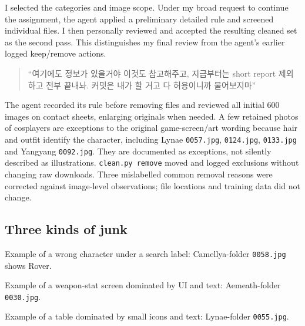 \documentclass[11pt]{article}
\begin{document}
I selected the categories and image scope. Under my broad request to continue the assignment, the agent applied a preliminary detailed rule and screened individual files. I then personally reviewed and accepted the resulting cleaned set as the second pass. This distinguishes my final review from the agent's earlier logged keep/remove actions.
\begin{quote}
``여기에도 정보가 있을거야 이것도 참고해주고, 지금부터는 short report 제외하고 전부 끝내놔. 커밋은 내가 할 거고 다 허용이니까 물어보지마''
\end{quote}
The agent recorded its rule before removing files and reviewed all initial 600 images on contact sheets, enlarging originals when needed. A few retained photos of cosplayers are exceptions to the original game-screen/art wording because hair and outfit identify the character, including Lynae \texttt{0057.jpg}, \texttt{0124.jpg}, \texttt{0133.jpg} and Yangyang \texttt{0092.jpg}. They are documented as exceptions, not silently described as illustrations. \texttt{clean.py remove} moved and logged exclusions without changing raw downloads. Three mislabelled common removal reasons were corrected against image-level observations; file locations and training data did not change.

\subsection*{Three kinds of junk}
\par\noindent\begin{minipage}{\linewidth}
Example of a wrong character under a search label: Camellya-folder \texttt{0058.jpg} shows Rover.
\begin{center}\par\noindent {}\par\end{center}
\end{minipage}\par\medskip
\par\noindent\begin{minipage}{\linewidth}
Example of a weapon-stat screen dominated by UI and text: Aemeath-folder \texttt{0030.jpg}.
\begin{center}\par\noindent {}\par\end{center}
\end{minipage}\par\medskip
\par\noindent\begin{minipage}{\linewidth}
Example of a table dominated by small icons and text: Lynae-folder \texttt{0055.jpg}.
\begin{center}\par\noindent {}\par\end{center}
\end{minipage}\par\medskip
\end{document}
